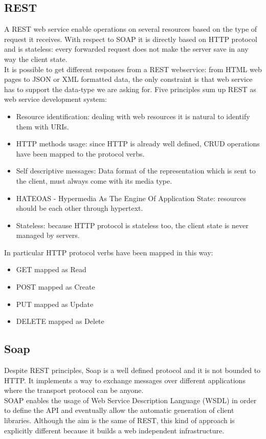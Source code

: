 \subsection{REST}
\label{subsection:REST}
A REST web service enable operations on several resources based on the type of request it receives.
With respect to SOAP it is directly based on HTTP protocol and is stateless: every forwarded request does not make the server save in any way the client state.\\
It is possible to get different responses from a REST webservice: from HTML web pages to JSON or XML formatted data, the only constraint is that web service has to support the data-type we are asking for.
Five principles sum up REST as web service development system:
\begin{itemize}
    \item Resource identification: dealing with web resources it is natural to identify them with URIs.
    \item HTTP methods usage: since HTTP is already well defined, CRUD operations have been mapped to the protocol verbs.
    \item Self descriptive messages: Data format of the representation which is sent to the client, must always come with its media type.
    \item HATEOAS - Hypermedia As The Engine Of Application State: resources should be  each other through hypertext.
    \item Stateless: because HTTP protocol is stateless too, the client state is never managed by servers.
\end{itemize}
In particular HTTP protocol verbs have been mapped in this way:
\begin{itemize}
    \item GET mapped as Read
    \item POST mapped as Create
    \item PUT mapped as Update
    \item DELETE mapped as Delete
\end{itemize}
\subsection{Soap}
\label{subsection:Soap}
Despite REST principles, Soap is a well defined protocol and it is not bounded to HTTP. It implements a way to exchange messages over different applications where the transport protocol can be anyone.\\
SOAP enables the usage of Web Service Description Language (WSDL) in order to define the API and eventually allow the automatic generation of client libraries.
Although the aim is the same of REST, this kind of approach is explicitly different because it builds a web independent infrastructure.

